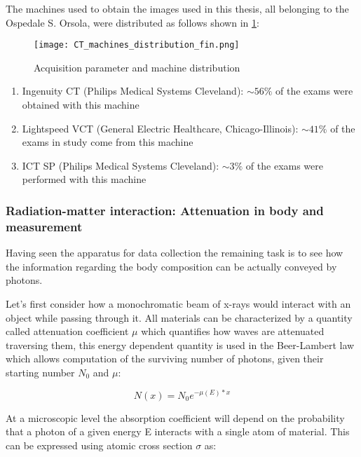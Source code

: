 The machines used to obtain the images used in this thesis, all belonging to the Ospedale S. Orsola, were distributed as follows shown in \ref{fig:ct_dist}:


\begin{figure}[H]
\centering
  		\texttt{[image: CT\_machines\_distribution\_fin.png]}
        \caption{Acquisition parameter and machine distribution\label{fig:ct_dist}}
\end{figure}

\begin{enumerate}
\item Ingenuity CT  (Philips Medical Systems Cleveland):  $\sim 56\%$ of the exams were obtained with this machine
\item Lightspeed VCT  (General Electric Healthcare, Chicago-Illinois): $\sim 41\%$ of the exams in study come from this machine
\item ICT SP (Philips Medical Systems Cleveland):  $\sim 3\%$ of the exams were performed with this machine
\end{enumerate}

\subsubsection{Radiation-matter interaction: Attenuation in body and measurement}
Having seen the apparatus for data collection the remaining task is to see how the information regarding the body composition can be actually conveyed by photons.

Let's first consider how a monochromatic beam of x-rays would interact with an object while passing through it. All materials can be characterized by a quantity called attenuation coefficient $\mu$ which quantifies how waves are attenuated traversing them, this energy dependent quantity is used in the Beer-Lambert law which allows computation of the surviving number of photons, given their starting number $N_0$ and $\mu$:

\begin{equation}
N(x) = N_0e^{-\mu(E)*x}
\label{Beer-Lambert}
\end{equation}

At a microscopic level the absorption coefficient will depend on the probability that a photon of a given energy E interacts with a single atom of material. This can be expressed using atomic cross section $\sigma$ as:

